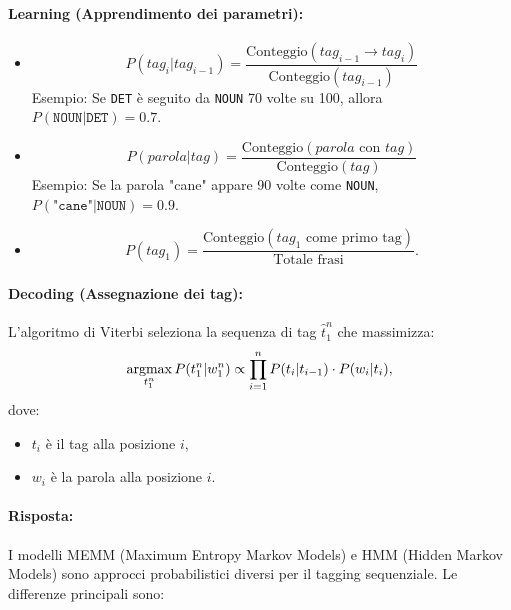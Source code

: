 \paragraph{Learning (Apprendimento dei parametri):}
\begin{itemize}
    \item {} 
    $$P(tag_i | tag_{i-1}) = \frac{\text{Conteggio}(tag_{i-1} \rightarrow tag_i)}{\text{Conteggio}(tag_{i-1})}$$
    Esempio: Se \texttt{DET} è seguito da \texttt{NOUN} 70 volte su 100, allora $P(\texttt{NOUN}|\texttt{DET}) = 0.7$.

    \item {} 
    $$P(parola | tag) = \frac{\text{Conteggio}(parola \text{ con } tag)}{\text{Conteggio}(tag)}$$
    Esempio: Se la parola "cane" appare 90 volte come \texttt{NOUN}, $P(\texttt{"cane"}|\texttt{NOUN}) = 0.9$.

    \item {} 
    $$P(tag_1) = \frac{\text{Conteggio}(tag_1 \text{ come primo tag})}{\text{Totale frasi}}.$$
\end{itemize}

\paragraph{Decoding (Assegnazione dei tag):}
L'algoritmo di Viterbi seleziona la sequenza di tag $\hat{t}_1^n$ che massimizza:
$$\operatorname*{arg max}_{t_1^n} P(t_1^n | w_1^n) \propto \prod_{i=1}^n P(t_i | t_{i-1}) \cdot P(w_i | t_i),$$
dove:
\begin{itemize}
    \item $t_i$ è il tag alla posizione $i$,
    \item $w_i$ è la parola alla posizione $i$.
\end{itemize}


\paragraph{Risposta:} I modelli MEMM (Maximum Entropy Markov Models) e HMM (Hidden Markov Models) sono approcci probabilistici diversi per il tagging sequenziale. Le differenze principali sono:

